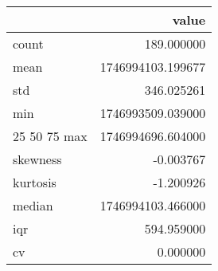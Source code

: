 \begin{tabular}{lr}
\toprule
 & value \\
\midrule
count & 189.000000 \\
mean & 1746994103.199677 \\
std & 346.025261 \\
min & 1746993509.039000 \\
25%
50%
75%
max & 1746994696.604000 \\
skewness & -0.003767 \\
kurtosis & -1.200926 \\
median & 1746994103.466000 \\
iqr & 594.959000 \\
cv & 0.000000 \\
\bottomrule
\end{tabular}

